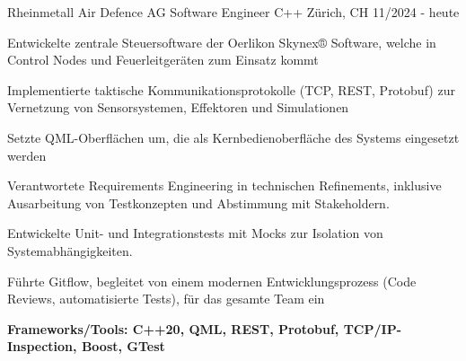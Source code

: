 \cventry
{Rheinmetall Air Defence AG} %
{Software Engineer C++} %
{Zürich, CH} %
{11/2024 - heute} %
\begin{cvitems}
\item Entwickelte zentrale Steuersoftware der Oerlikon Skynex® Software, welche in Control Nodes und Feuerleitgeräten zum Einsatz kommt
\item Implementierte taktische Kommunikationsprotokolle (TCP, REST, Protobuf) zur Vernetzung von Sensorsystemen, Effektoren und Simulationen
\item Setzte QML-Oberflächen um, die als Kernbedienoberfläche des Systems eingesetzt werden
\item Verantwortete Requirements Engineering in technischen Refinements, inklusive Ausarbeitung von Testkonzepten und Abstimmung mit Stakeholdern.
\item Entwickelte Unit- und Integrationstests mit Mocks zur Isolation von Systemabhängigkeiten.
\item Führte Gitflow, begleitet von einem modernen Entwicklungsprozess (Code Reviews, automatisierte Tests), für das gesamte Team ein
\item[] \textbf{Frameworks/Tools: C++20, QML, REST, Protobuf, TCP/IP-Inspection, Boost, GTest}
\end{cvitems}
